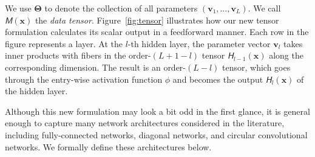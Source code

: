 \documentclass{article} %
\def\vv{{\bm{v}}}
\def\vx{{\bm{x}}}
\def\mI{{\bm{I}}}
\newcommand{\tens}[1]{\bm{\mathsfit{#1}}}
\def\tH{{\tens{H}}}
\def\tM{{\tens{M}}}
\newcommand{\bTheta}{\bm{\Theta}}
\begin{document}

We use $\bTheta$ to denote the collection of all parameters $(\vv_1, \dots, \vv_L)$. We call $\tM(\vx)$ the \emph{data tensor}.
Figure~\ref{fig:tensor} illustrates how our new tensor formulation calculates its scalar output in a feedforward manner. Each row in the figure represents a layer. At the $l$-th hidden layer, the parameter vector $\vv_l$ takes inner products with fibers in the order-$(L+1-l)$ tensor $\tH_{l-1}(\vx)$ along the corresponding dimension. The result is an order-$(L-l)$ tensor, which goes through the entry-wise activation function $\phi$ and becomes the output $\tH_l(\vx)$ of the hidden layer.

Although this new formulation may look a bit odd in the first glance, it is general enough to capture many network architectures considered in the literature, including fully-connected networks, diagonal networks, and circular convolutional networks. 
We formally define these architectures below.
\end{document}

